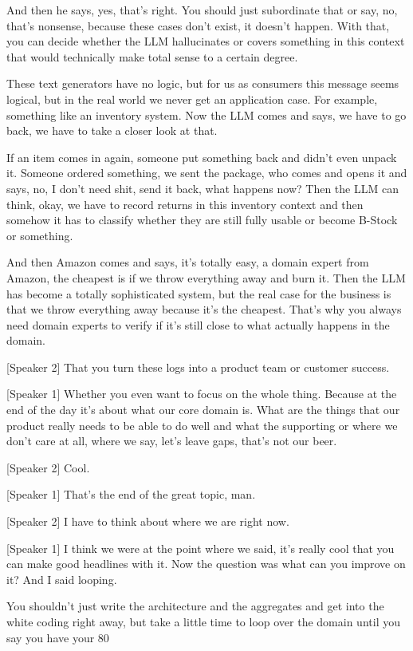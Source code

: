 And then he says, yes, that's right. You should just subordinate that or say, no, that's nonsense, because these cases don't exist, it doesn't happen. With that, you can decide whether the LLM hallucinates or covers something in this context that would technically make total sense to a certain degree.

These text generators have no logic, but for us as consumers this message seems logical, but in the real world we never get an application case. For example, something like an inventory system. Now the LLM comes and says, we have to go back, we have to take a closer look at that.

If an item comes in again, someone put something back and didn't even unpack it. Someone ordered something, we sent the package, who comes and opens it and says, no, I don't need shit, send it back, what happens now? Then the LLM can think, okay, we have to record returns in this inventory context and then somehow it has to classify whether they are still fully usable or become B-Stock or something.

And then Amazon comes and says, it's totally easy, a domain expert from Amazon, the cheapest is if we throw everything away and burn it. Then the LLM has become a totally sophisticated system, but the real case for the business is that we throw everything away because it's the cheapest. That's why you always need domain experts to verify if it's still close to what actually happens in the domain.

[Speaker 2]
That you turn these logs into a product team or customer success.

[Speaker 1]
Whether you even want to focus on the whole thing. Because at the end of the day it's about what our core domain is. What are the things that our product really needs to be able to do well and what the supporting or where we don't care at all, where we say, let's leave gaps, that's not our beer.

[Speaker 2]
Cool.

[Speaker 1]
That's the end of the great topic, man.

[Speaker 2]
I have to think about where we are right now.

[Speaker 1]
I think we were at the point where we said, it's really cool that you can make good headlines with it. Now the question was what can you improve on it? And I said looping.

You shouldn't just write the architecture and the aggregates and get into the white coding right away, but take a little time to loop over the domain until you say you have your 80%

